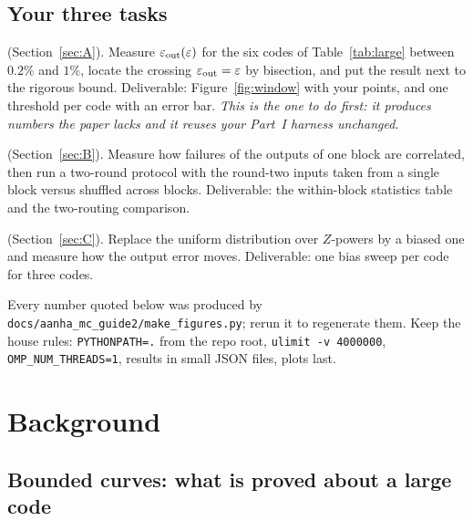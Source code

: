\documentclass[11pt]{article}
\newcommand{\eps}{\varepsilon}
\newcommand{\code}[1]{\texttt{#1}}
\begin{document}
\subsection{Your three tasks}

\begin{description}[nosep]
\item[A. Thresholds of the large codes by sampling] (Section~\ref{sec:A}). Measure
  $\eps_{\rm out}(\eps)$ for the six codes of Table~\ref{tab:large} between $0.2\%$
  and $1\%$, locate the crossing $\eps_{\rm out}=\eps$ by bisection, and put the result
  next to the rigorous bound. Deliverable: Figure~\ref{fig:window} with your points,
  and one threshold per code with an error bar. \emph{This is the one to do first: it
  produces numbers the paper lacks and it reuses your Part~I harness unchanged.}
\item[B. The correlation test] (Section~\ref{sec:B}). Measure how failures of the
  outputs of one block are correlated, then run a two-round protocol with the
  round-two inputs taken from a single block versus shuffled across blocks.
  Deliverable: the within-block statistics table and the two-routing comparison.
\item[C. Biased noise] (Section~\ref{sec:C}). Replace the uniform distribution over
  $Z$-powers by a biased one and measure how the output error moves. Deliverable: one
  bias sweep per code for three codes.
\end{description}

Every number quoted below was produced by
\code{docs/aanha\_mc\_guide2/make\_figures.py}; rerun it to regenerate them. Keep
the house rules: \code{PYTHONPATH=.} from the repo root, \code{ulimit -v 4000000},
\code{OMP\_NUM\_THREADS=1}, results in small JSON files, plots last.

\section{Background}
\label{sec:bg}

\subsection{Bounded curves: what is proved about a large code}
\end{document}
